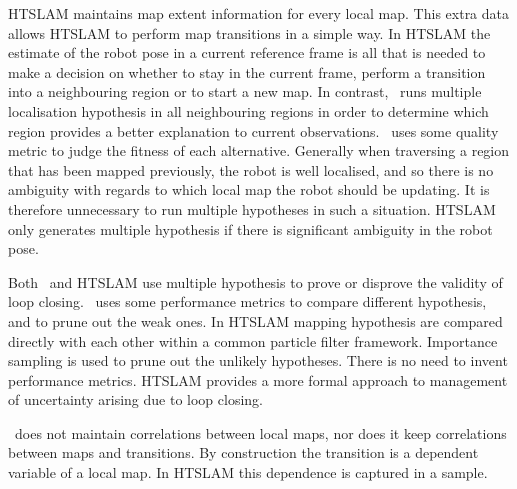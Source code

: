 
HTSLAM maintains map extent information for every local map. This
extra data allows HTSLAM to perform map transitions in a simple
way. In HTSLAM the estimate of the robot pose in a current reference
frame is all that is needed to make a decision on whether to stay in
the current frame, perform a transition into a neighbouring region or
to start a new map. In contrast, \Atlas\ runs multiple localisation
hypothesis in all neighbouring regions in order to determine which
region provides a better explanation to current observations. \Atlas\
uses some quality metric to judge the fitness of each
alternative. Generally when traversing a region that has been mapped
previously, the robot is well localised, and so there is no ambiguity with
regards to which local map the robot should be updating. It is therefore
unnecessary to run multiple hypotheses in such a situation. HTSLAM only
generates multiple hypothesis if there is significant ambiguity in the
robot pose.


Both \Atlas\ and HTSLAM use multiple hypothesis to prove or disprove the
validity of loop closing. \Atlas\ uses some performance metrics to
compare different hypothesis, and to prune out the weak ones. In HTSLAM
mapping hypothesis are compared directly with each other within a common
particle filter framework. Importance sampling is used to prune out the
unlikely hypotheses. There is no need to invent performance
metrics. HTSLAM provides a more formal approach to management of
uncertainty arising due to loop closing.



\Atlas\ does not maintain correlations between local maps, nor does it
keep correlations between maps and transitions. By construction the
transition is a dependent variable of a local map. In HTSLAM this
dependence is captured in a sample.





